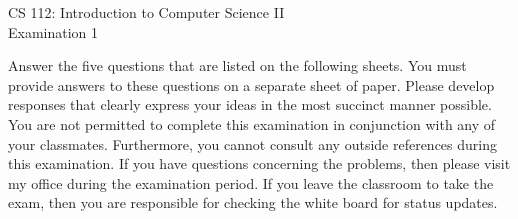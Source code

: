 \documentclass[12pt]{article}
\def\widow#1{\vskip #1\vbadness10000\penalty-200\vskip-#1}
\begin{document}

\def\widow#1{\vskip #1\vbadness10000\penalty-200\vskip-#1}

\begin{center}

CS 112: Introduction to Computer Science II \\
Examination 1 \\

\end{center}

\noindent Answer the five questions that are listed on the following sheets.  You must provide answers to these
questions on a separate sheet of paper.  Please develop responses that clearly express your ideas in the most succinct
manner possible.  You are not permitted to complete this examination in conjunction with any of your classmates.
Furthermore, you cannot consult any outside references during this examination.  If you have questions concerning the
problems, then please visit my office during the examination period.  If you leave the classroom to take the exam, then
you are responsible for checking the white board for status updates.

\newpage
\end{document}
